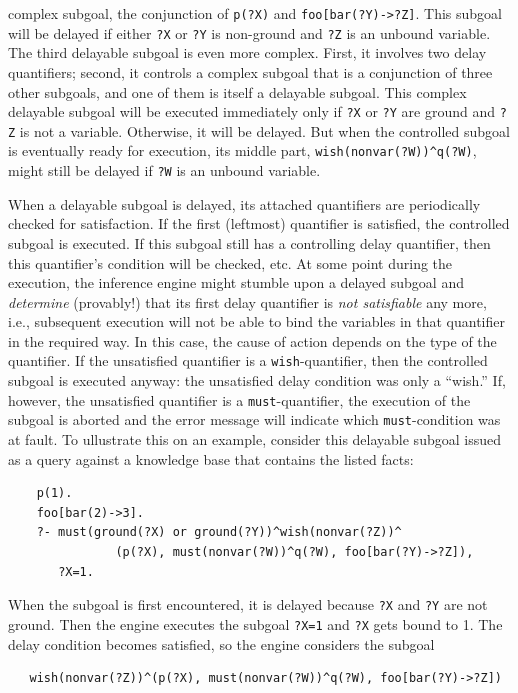 \documentclass[11pt]{article}
\begin{document}
complex subgoal, the conjunction of \texttt{p(?X)} and
\texttt{foo[bar(?Y)->?Z]}.  This subgoal will be delayed if either
\texttt{?X} or \texttt{?Y} is non-ground and \texttt{?Z} is an unbound
variable. The third delayable subgoal is even more complex. First, it
involves two delay quantifiers; second, it controls a complex subgoal that
is a conjunction of three other subgoals, and one of them is itself a
delayable subgoal.  This complex delayable subgoal will be executed
immediately only if \texttt{?X} or \texttt{?Y} are ground and \texttt{?Z}
is not a variable.  Otherwise, it will be delayed. But when the controlled
subgoal is eventually ready for execution, its middle part,
\texttt{wish(nonvar(?W))\^{}q(?W)}, might still be delayed if \texttt{?W}
is an unbound variable.

When a delayable subgoal is delayed, its attached quantifiers are
periodically checked for satisfaction. If the first (leftmost) quantifier is satisfied,
the controlled subgoal is executed. If this subgoal still has a controlling
delay quantifier, then this quantifier's condition will be checked, etc.
At some point during the execution, the inference engine might stumble upon
a delayed subgoal and \emph{determine} (provably!) 
that its first delay quantifier is \emph{not satisfiable} any more, i.e.,
subsequent execution will not be able to bind the variables in that quantifier
in the required way.
In this case, the cause of action depends on the type of the quantifier.
If the unsatisfied quantifier is a  \texttt{wish}-quantifier, then the  
controlled subgoal is executed anyway: the unsatisfied delay condition
was only a ``wish.'' If, however, the unsatisfied quantifier is a
\texttt{must}-quantifier, the execution of the subgoal is aborted and 
the error message will indicate which 
\texttt{must}-condition was at fault.
To ullustrate this on an example, consider this delayable subgoal issued as
a query against a knowledge base that contains the listed facts:
\begin{verbatim}
    p(1).
    foo[bar(2)->3].
    ?- must(ground(?X) or ground(?Y))^wish(nonvar(?Z))^
               (p(?X), must(nonvar(?W))^q(?W), foo[bar(?Y)->?Z]),
       ?X=1.
\end{verbatim}
When the subgoal is first encountered, it is delayed because \texttt{?X}
and \texttt{?Y} are not ground. Then the engine executes the subgoal
\texttt{?X=1} and \texttt{?X} gets bound to 1. The
delay condition becomes satisfied, so the engine considers the subgoal
\begin{verbatim}
   wish(nonvar(?Z))^(p(?X), must(nonvar(?W))^q(?W), foo[bar(?Y)->?Z])
\end{verbatim}
\end{document}
